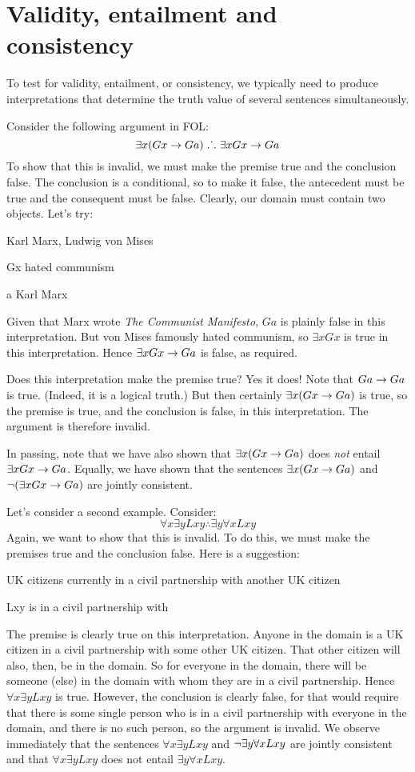 \section{Validity, entailment and consistency}
To test for validity, entailment, or consistency, we typically need to produce interpretations that determine the truth value of several sentences simultaneously. 

Consider the following argument in FOL:
$$\exists x(Gx \rightarrow Ga) \mathrel{\ldotp\dot{}\,\ldotp} \exists x Gx \rightarrow Ga$$
To show that this is invalid, we must make the premise true and the conclusion false. The conclusion is a conditional, so to make it false, the antecedent must be true and the consequent must be false. Clearly, our domain must contain two objects. Let's try:
	\begin{ekey}
		\item[\text{domain}] Karl Marx, Ludwig von Mises
		\item[Gx]  hated communism
		\item[a] Karl Marx
	\end{ekey}
Given that Marx wrote \emph{The Communist Manifesto}, $Ga$ is plainly false in this interpretation. But von Mises famously hated communism, so $\exists x Gx$ is true in this interpretation. Hence $\exists x Gx \rightarrow Ga$ is false, as required. 

Does this interpretation make the premise true? Yes it does! Note that $Ga \rightarrow Ga$ is true. (Indeed, it is a logical truth.) But then certainly $\exists x (Gx \rightarrow Ga)$ is true, so the premise is true, and the conclusion is false, in this interpretation. The argument is therefore invalid. 

In passing, note that we have also shown that $\exists x(Gx \rightarrow Ga)$ does \emph{not} entail $\exists x Gx \rightarrow Ga$. Equally, we have shown that the sentences $\exists x (Gx \rightarrow Ga)$ and $\neg (\exists x Gx \rightarrow Ga)$ are jointly consistent.

Let's consider a second example. Consider:
	$$\forall x \exists y Lxy \therefore \exists y \forall x Lxy$$
Again, we want to show that this is invalid. To do this, we must make the premises true and the conclusion false. Here is a suggestion:
	\begin{ekey}
		\item[\text{domain}] UK citizens currently in a civil partnership with another UK citizen
		\item[Lxy]  is in a civil partnership with \gap{y}
	\end{ekey}
The premise is clearly true on this interpretation. Anyone in the domain is a UK citizen in a civil partnership with some other UK citizen. That other citizen will also, then, be in the domain. So for everyone in the domain, there will be someone (else) in the domain with whom they are in a civil partnership. Hence $\forall x \exists y Lxy$ is true. However, the conclusion is clearly false, for that would require that there is some single person who is in a civil partnership with everyone in the domain, and there is no such person, so the argument is invalid. We observe immediately that the sentences $\forall x \exists y Lxy$ and $\neg\exists y \forall x Lxy$ are jointly consistent and that $\forall x \exists y Lxy$ does not entail $\exists y \forall x Lxy$. 

